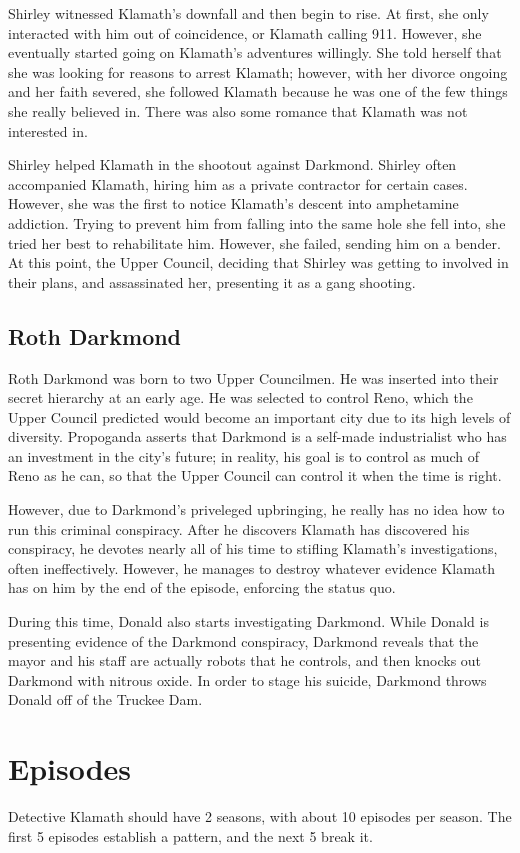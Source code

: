 \documentclass{article}
\begin{document}
Shirley witnessed Klamath's downfall and then begin to rise. At first, she only interacted with him out of coincidence, or Klamath calling 911. However, she eventually started going on Klamath's adventures willingly. She told herself that she was looking for reasons to arrest Klamath; however, with her divorce ongoing and her faith severed, she followed Klamath because he was one of the few things she really believed in. There was also some romance that Klamath was not interested in.

Shirley helped Klamath in the shootout against Darkmond. Shirley often accompanied Klamath, hiring him as a private contractor for certain cases. However, she was the first to notice Klamath's descent into amphetamine addiction. Trying to prevent him from falling into the same hole she fell into, she tried her best to rehabilitate him. However, she failed, sending him on a bender. At this point, the Upper Council, deciding that Shirley was getting to involved in their plans, and assassinated her, presenting it as a gang shooting.

\subsection{Roth Darkmond}

Roth Darkmond was born to two Upper Councilmen. He was inserted into their secret hierarchy at an early age. He was selected to control Reno, which the Upper Council predicted would become an important city due to its high levels of diversity. Propoganda asserts that Darkmond is a self-made industrialist who has an investment in the city's future; in reality, his goal is to control as much of Reno as he can, so that the Upper Council can control it when the time is right.

However, due to Darkmond's priveleged upbringing, he really has no idea how to run this criminal conspiracy. After he discovers Klamath has discovered his conspiracy, he devotes nearly all of his time to stifling Klamath's investigations, often ineffectively. However, he manages to destroy whatever evidence Klamath has on him by the end of the episode, enforcing the status quo.

During this time, Donald also starts investigating Darkmond. While Donald is presenting evidence of the Darkmond conspiracy, Darkmond reveals that the mayor and his staff are actually robots that he controls, and then knocks out Darkmond with nitrous oxide. In order to stage his suicide, Darkmond throws Donald off of the Truckee Dam.

\section{Episodes}

Detective Klamath should have 2 seasons, with about 10 episodes per season. The first 5 episodes establish a pattern, and the next 5 break it.
\end{document}
